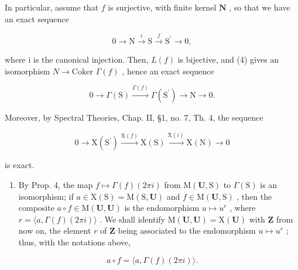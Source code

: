 In particular, assume that \(f\) is surjective, with finite kernel \(\mathbf{N}\) , so that we have an exact sequence

\[
0 \longrightarrow \mathrm{N} \stackrel {i} {\longrightarrow} \mathrm{S} \stackrel {f} {\longrightarrow} \mathrm{S} ^ {\prime} \longrightarrow 0,
\]

where i is the canonical injection. Then, \(L(f)\) is bijective, and (4) gives an isomorphism \(N \to \text{Coker } \Gamma(f)\) , hence an exact sequence

\[
0 \longrightarrow \Gamma (\mathrm{S}) \stackrel {\Gamma (f)} {\longrightarrow} \Gamma (\mathrm{S} ^ {\prime}) \longrightarrow \mathrm{N} \longrightarrow 0.\tag{5}
\]

Moreover, by Spectral Theories, Chap. II, §1, no. 7, Th. 4, the sequence

\[
0 \longrightarrow \mathrm{X} (\mathrm{S} ^ {\prime}) \stackrel {{\mathrm{X} (f)}} {{\longrightarrow}} \mathrm{X} (\mathrm{S}) \stackrel {{\mathrm{X} (i)}} {{\longrightarrow}} \mathrm{X} (\mathrm{N}) \longrightarrow 0\tag{6}
\]

is exact.

\begin{enumerate}
\def\labelenumi{\arabic{enumi})}
\setcounter{enumi}{1}
\tightlist
\item
  By Prop. 4, the map \(f \mapsto \Gamma(f)(2\pi i)\) from \(\mathrm{M}(\mathbf{U},\mathrm{S})\) to \(\Gamma(\mathrm{S})\) is an isomorphism; if \(a \in \mathrm{X}(\mathrm{S}) = \mathrm{M}(\mathrm{S},\mathbf{U})\) and \(f \in \mathrm{M}(\mathbf{U},\mathrm{S})\) , then the composite \(a \circ f \in \mathrm{M}(\mathbf{U},\mathbf{U})\) is the endomorphism \(u \mapsto u^r\) , where \(r = \langle a,\Gamma(f)(2\pi i)\rangle\) . We shall identify \(\mathrm{M}(\mathbf{U},\mathbf{U}) = \mathrm{X}(\mathbf{U})\) with \(\mathbf{Z}\) from now on, the element \(r\) of \(\mathbf{Z}\) being associated to the endomorphism \(u \mapsto u^r\) ; thus, with the notations above,
\end{enumerate}

\[
a \circ f = \langle a, \Gamma (f) (2 \pi i) \rangle .
\]

